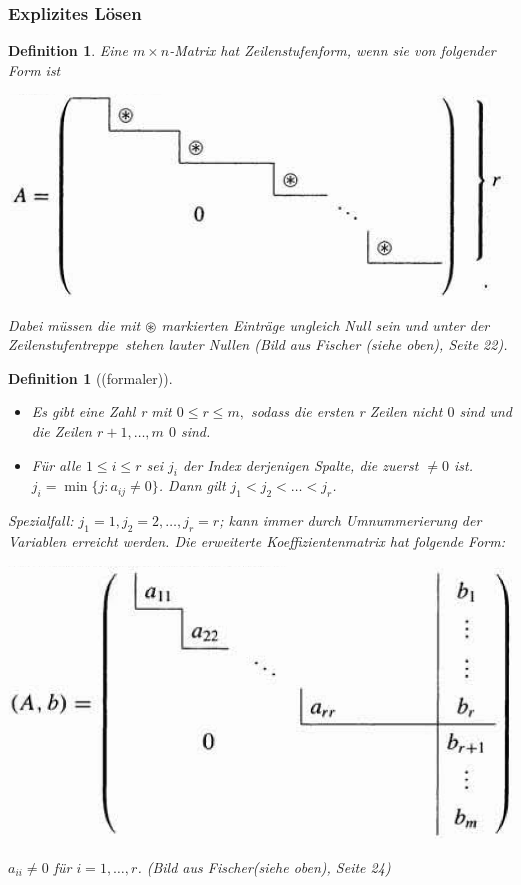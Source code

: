 \documentclass[12pt,a4paper]{article}
\theoremstyle{plain}
\newtheorem{Definition}[Theorem]{Definition}
\numberwithin{equation}{section}
\begin{document}
\subsubsection{Explizites Lösen}
\begin{Definition}
Eine $m\times n$-Matrix hat Zeilenstufenform, wenn sie von folgender Form ist
\begin{minipage}{0.48\textwidth}
\includegraphics[width=\textwidth]{pics/g36.png} \end{minipage}
\begin{minipage}{0.48\textwidth} Dabei müssen die mit $\circledast$ markierten Einträge ungleich Null sein und unter der \glqq Zeilenstufentreppe\grqq\ stehen lauter Nullen (Bild aus Fischer (siehe oben), Seite 22). \end{minipage} 
\end{Definition}
\begin{Definition}[(formaler)]
\begin{itemize}
\item Es gibt eine Zahl r mit $0\leq r\leq m,$ sodass die ersten r Zeilen nicht $0$ sind und die Zeilen $r+1,\ldots,m$ $0$ sind.
\item Für alle $1\leq i\leq r$ sei $j_i$ der Index derjenigen Spalte, die zuerst $\neq 0$ ist. $j_i=\min\{j:a_{ij}\neq 0\}$. Dann gilt $j_1<j_2<\ldots<j_r$.
\end{itemize}
Spezialfall: $j_1=1, j_2=2, \ldots, j_r=r$; kann immer durch Umnummerierung der Variablen erreicht werden.
Die erweiterte Koeffizientenmatrix hat folgende Form:\\ 
\begin{minipage}{0.48\textwidth} \includegraphics[width=\textwidth]{pics/ErwKoeffMat.png}\end{minipage} \begin{minipage}{0.48\textwidth} $a_{ii}\neq 0$ für $i=1,\ldots,r$. (Bild aus Fischer(siehe oben), Seite 24) \end{minipage}
\end{Definition}
\end{document}
